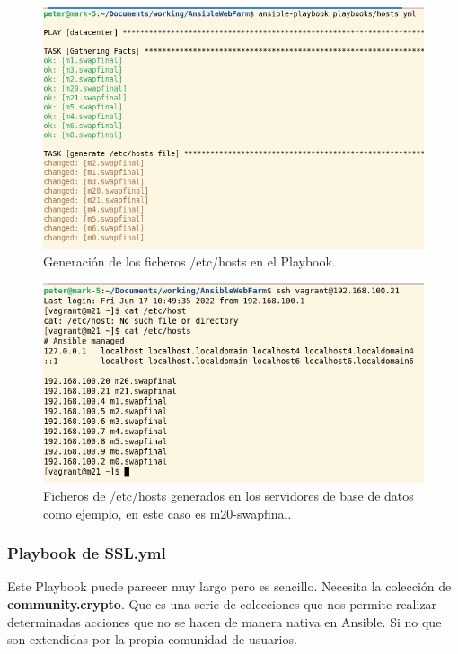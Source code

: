 \begin{figure}[H]
	\centering
	\includegraphics[scale=0.35]{img/ansible1}
	\caption{Generación de los ficheros /etc/hosts en el Playbook.}
\end{figure}

\begin{figure}[H]
	\centering
	\includegraphics[scale=0.35]{img/ansible2}
	\caption{Ficheros de /etc/hosts generados en los servidores de base de datos como ejemplo, en este caso es m20-swapfinal.}
\end{figure}

\newpage
\subsubsection{Playbook de SSL.yml}

Este Playbook puede parecer muy largo pero es sencillo. Necesita la colección de \textbf{community.crypto}. Que es una serie de colecciones que nos permite realizar determinadas acciones que no se hacen de manera nativa en Ansible. Si no que son extendidas por la propia comunidad de usuarios.
\vspace{5mm}

